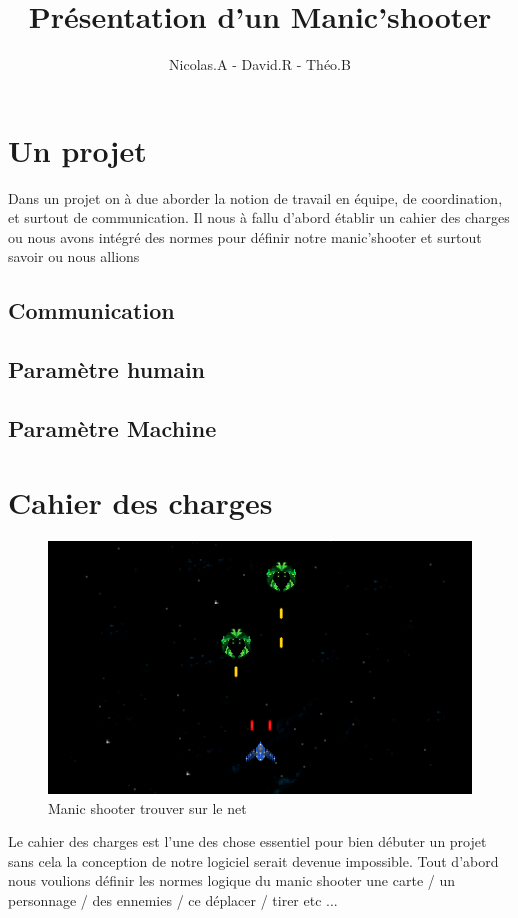 \documentclass[a4paper, 11pt]{article}
\title{Présentation d'un Manic'shooter}
\author{Nicolas.A - David.R - Théo.B}
\begin{document}
\maketitle
\tableofcontents
\section{Un projet}

Dans un projet on à due aborder la notion de travail en équipe, de coordination, et surtout de communication.
Il nous à fallu d'abord établir un cahier des charges ou nous avons intégré des normes pour définir notre manic'shooter et surtout savoir ou nous allions
 \subsection{Communication}
 \subsection{Paramètre humain}
 \subsection{Paramètre Machine}
 
\section{Cahier des charges}

\begin{figure}[ht!]
 \centering
 \includegraphics[width=0.7\linewidth]{picture.png}
 \caption{Manic shooter trouver sur le net}
 \label{fig::example::one}
\end{figure}
Le cahier des charges est l'une des chose essentiel pour bien débuter un projet sans cela la conception de notre logiciel serait devenue impossible.
Tout d'abord nous voulions définir les normes logique du manic shooter 
une carte / un personnage / des ennemies / ce déplacer / tirer etc ... 
\end{document}

